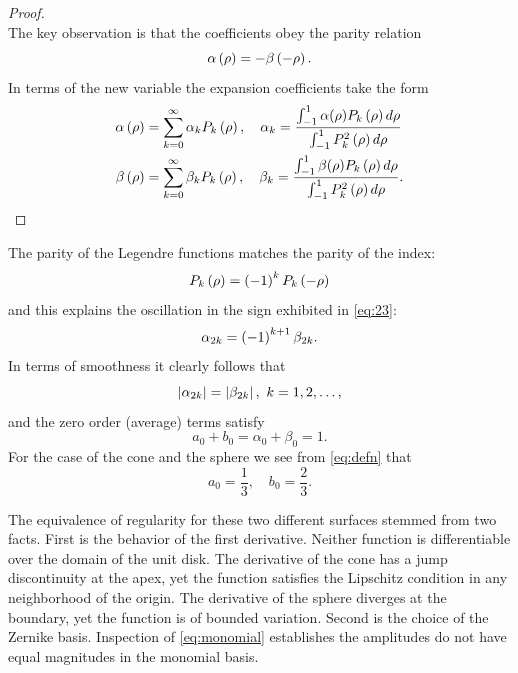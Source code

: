 \documentclass[preprint,12pt]{elsarticle}
\begin{document}
{\begin{proof}
\begin{equation}
    \label{eq:rhov}
  \end{equation}
The key observation is that the coefficients obey the parity relation
\begin{equation}
  \alpha\left( \rho \right) = -\beta\left( -\rho \right).
  \label{eq:parity}
\end{equation}
In terms of the new variable the expansion coefficients take the form
  \begin{equation}
    \begin{split}
    \alpha\paren{\rho} & = \sum_{k=0}^{\infty} \alpha_{k} P_{k}\paren{\rho}, 
     \quad \alpha_{k} = \frac{\int_{-1}^{1}\alpha(\rho) P_{k}\paren{\rho} d\rho}{\int_{-1}^{1} P_{k}^{2}\paren{\rho} d\rho} \\
%
    \beta\paren{\rho} & = \sum_{k=0}^{\infty} \beta_{k} P_{k}\paren{\rho}, 
     \quad \beta_{k} = \frac{\int_{-1}^{1}\beta(\rho) P_{k}\paren{\rho} d\rho}{\int_{-1}^{1} P_{k}^{2}\paren{\rho} d\rho}.
    \end{split}
    \label{eq:defn}
  \end{equation}
\end{proof}  %
}
The parity of the Legendre functions matches the parity of the index:
\begin{equation}
  P_{k}\left( \rho \right) = \left( -1 \right)^{k} P_{k}\left( -\rho \right)
\end{equation}
and this explains the oscillation in the sign exhibited in \eqref{eq:23}:
\begin{equation}
  \alpha_{2k} = \left( -1 \right)^{k+1} \beta_{2k}.
  \label{eq:equals}
\end{equation}
In terms of smoothness it clearly follows that
\begin{equation}
  \left|\alpha_{2k}\right| = \left|\beta_{2k}\right|,\ k=1,2,\dots,
  \label{eq:canona}
\end{equation}
and the zero order (average) terms satisfy
\begin{equation}
  a_{0} + b_{0} = \alpha_{0} + \beta_{0} = 1.
  \label{eq:canonb}
\end{equation}
For the case of the cone and the sphere we see from \eqref{eq:defn} that 
\begin{equation}
  a_{0} = \frac{1}{3}, \quad
  b_{0} = \frac{2}{3}.
\end{equation}

The equivalence of regularity for these two different surfaces stemmed from two facts. First is the behavior of the first derivative. Neither function is differentiable over the domain of the unit disk. The derivative of the cone has a jump discontinuity at the apex, yet the function satisfies the Lipschitz condition in any neighborhood of the origin. The derivative of the sphere diverges at the boundary, yet the function is of bounded variation. Second is the choice of the Zernike basis. Inspection of \eqref{eq:monomial} establishes the amplitudes do not have equal magnitudes in the monomial basis. 
\end{document}
